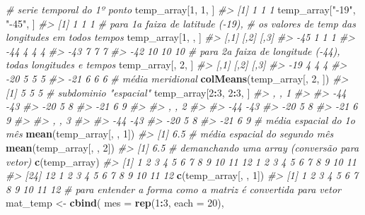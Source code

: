 \documentclass[]{book}
\newenvironment{Shaded}{\begin{snugshade}}{\end{snugshade}}
\newcommand{\KeywordTok}[1]{\textcolor[rgb]{0.13,0.29,0.53}{\textbf{#1}}}
\newcommand{\DataTypeTok}[1]{\textcolor[rgb]{0.13,0.29,0.53}{#1}}
\newcommand{\DecValTok}[1]{\textcolor[rgb]{0.00,0.00,0.81}{#1}}
\newcommand{\StringTok}[1]{\textcolor[rgb]{0.31,0.60,0.02}{#1}}
\newcommand{\CommentTok}[1]{\textcolor[rgb]{0.56,0.35,0.01}{\textit{#1}}}
\newcommand{\OperatorTok}[1]{\textcolor[rgb]{0.81,0.36,0.00}{\textbf{#1}}}
\newcommand{\NormalTok}[1]{#1}
\begin{document}
\begin{Shaded}
\begin{Highlighting}[]
\CommentTok{# serie temporal do 1º ponto}
\NormalTok{temp_array[}\DecValTok{1}\NormalTok{, }\DecValTok{1}\NormalTok{, ]}
\CommentTok{#> [1] 1 1 1}
\NormalTok{temp_array[}\StringTok{"-19"}\NormalTok{, }\StringTok{"-45"}\NormalTok{, ]}
\CommentTok{#> [1] 1 1 1}
\CommentTok{# para 1a faixa de latitude (-19),}
\CommentTok{# os valores de temp das longitudes em todos tempos}
\NormalTok{temp_array[}\DecValTok{1}\NormalTok{, , ]}
\CommentTok{#>     [,1] [,2] [,3]}
\CommentTok{#> -45    1    1    1}
\CommentTok{#> -44    4    4    4}
\CommentTok{#> -43    7    7    7}
\CommentTok{#> -42   10   10   10}
\CommentTok{# para 2a faixa de longitude (-44), todas longitudes e tempos}
\NormalTok{temp_array[, }\DecValTok{2}\NormalTok{, ]}
\CommentTok{#>     [,1] [,2] [,3]}
\CommentTok{#> -19    4    4    4}
\CommentTok{#> -20    5    5    5}
\CommentTok{#> -21    6    6    6}
\CommentTok{# média meridional}
\KeywordTok{colMeans}\NormalTok{(temp_array[, }\DecValTok{2}\NormalTok{, ])}
\CommentTok{#> [1] 5 5 5}
\CommentTok{# subdominio "espacial"}
\NormalTok{temp_array[}\DecValTok{2}\OperatorTok{:}\DecValTok{3}\NormalTok{, }\DecValTok{2}\OperatorTok{:}\DecValTok{3}\NormalTok{, ]}
\CommentTok{#> , , 1}
\CommentTok{#> }
\CommentTok{#>     -44 -43}
\CommentTok{#> -20   5   8}
\CommentTok{#> -21   6   9}
\CommentTok{#> }
\CommentTok{#> , , 2}
\CommentTok{#> }
\CommentTok{#>     -44 -43}
\CommentTok{#> -20   5   8}
\CommentTok{#> -21   6   9}
\CommentTok{#> }
\CommentTok{#> , , 3}
\CommentTok{#> }
\CommentTok{#>     -44 -43}
\CommentTok{#> -20   5   8}
\CommentTok{#> -21   6   9}
\CommentTok{# média espacial do 1o mês}
\KeywordTok{mean}\NormalTok{(temp_array[, , }\DecValTok{1}\NormalTok{])}
\CommentTok{#> [1] 6.5}
\CommentTok{# média espacial do segundo mês}
\KeywordTok{mean}\NormalTok{(temp_array[, , }\DecValTok{2}\NormalTok{])}
\CommentTok{#> [1] 6.5}
\CommentTok{# demanchando uma array (conversão para vetor)}
\KeywordTok{c}\NormalTok{(temp_array)}
\CommentTok{#>  [1]  1  2  3  4  5  6  7  8  9 10 11 12  1  2  3  4  5  6  7  8  9 10 11}
\CommentTok{#> [24] 12  1  2  3  4  5  6  7  8  9 10 11 12}
\KeywordTok{c}\NormalTok{(temp_array[, , }\DecValTok{1}\NormalTok{])}
\CommentTok{#>  [1]  1  2  3  4  5  6  7  8  9 10 11 12}
\CommentTok{# para entender a forma como a matriz é convertida para vetor}
\NormalTok{mat_temp <-}\StringTok{ }\KeywordTok{cbind}\NormalTok{(}
  \DataTypeTok{mes =} \KeywordTok{rep}\NormalTok{(}\DecValTok{1}\OperatorTok{:}\DecValTok{3}\NormalTok{, }\DataTypeTok{each =} \DecValTok{20}\NormalTok{),}

\end{Highlighting}
\end{Shaded}
\end{document}

